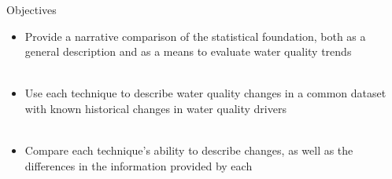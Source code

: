 \documentclass[serif]{beamer}\usepackage[]{graphicx}\usepackage[]{color}
\begin{document}
\begin{frame}{Objectives}
\begin{itemize}
\item Provide a narrative comparison of the statistical foundation, both as a general description and as a means to evaluate water quality trends \\~\\
\item Use each technique to describe water quality changes in a common dataset with known historical changes in water quality drivers \\~\\
\item Compare each technique's ability to describe changes, as well as the differences in the information provided by each
\end{itemize}
\end{frame}
\end{document}
